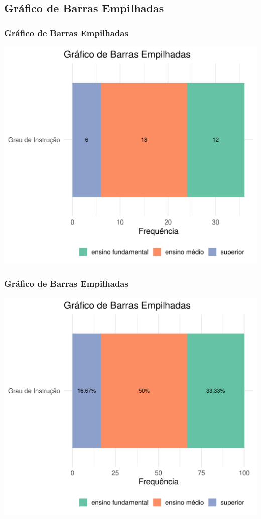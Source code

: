 \documentclass[14pt,aspectratio=1610]{beamer}
\begin{document}
\subsection{Gráfico de Barras Empilhadas}
\begin{frame}{}
\frametitle{Gráfico de Barras Empilhadas}
\begin{center}
\includegraphics{Aula4-empilhadas}
\end{center}
\end{frame}

\begin{frame}{}
\frametitle{Gráfico de Barras Empilhadas}
\begin{center}
\includegraphics{Aula4-empilhadas2}
\end{center}
\end{frame}
\end{document}
